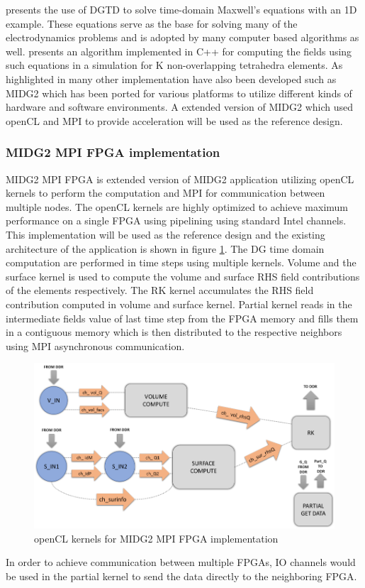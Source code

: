 \documentclass[english,notitlepage]{hgbreport}
\begin{document}
\textcite{Hesthaven_190449} presents the use of DGTD to solve time-domain Maxwell's equations with an 1D example.
These equations serve as the base for solving many of the electrodynamics problems and is adopted by
many computer based algorithms as well. \cite{} presents an algorithm implemented in C++ for computing
the fields using such equations in a simulation for K non-overlapping tetrahedra elements. As highlighted 
in \cite{} many other implementation have also been developed such as MIDG2
which has been ported for various platforms to utilize different kinds of hardware and software environments.
A extended version of MIDG2 which used openCL and MPI to provide acceleration will be used as the reference design.

\subsubsection{MIDG2 MPI FPGA implementation}
MIDG2 MPI FPGA is extended version of MIDG2 application utilizing openCL kernels to perform the
computation and MPI for communication between multiple nodes. The openCL kernels are
highly optimized to achieve maximum performance on a single FPGA using pipelining using
standard Intel channels. This implementation will be used as the reference design and
the existing architecture of the application is shown in figure \ref{fig:kernels}.
The DG time domain computation are performed in time steps using multiple kernels.
Volume and the surface kernel is used to compute the volume and surface RHS field
contributions of the elements respectively. The RK kernel accumulates the RHS
field contribution computed in volume and surface kernel. Partial kernel reads in
the intermediate fields value of last time step from the FPGA memory and fills them
in a contiguous memory which is then distributed to the respective neighbors using
MPI asynchronous communication.

\begin{figure}[h]%
    \centering
    \includegraphics[width=1.0\textwidth]{images/kernels}
    \caption{openCL kernels for MIDG2 MPI FPGA implementation}
    \label{fig:kernels}
\end{figure}
In order to achieve communication between multiple FPGAs, IO channels would be used
in the partial kernel to send the data directly to the neighboring FPGA.
\end{document}
